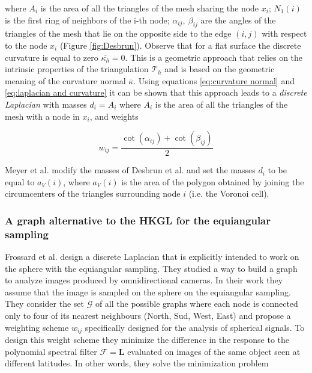 where $A_i$ is the area of all the triangles of the mesh sharing the node $x_i$; $N_1(i)$ is the first ring of neighbors of the i-th node; $\alpha_{i j},\ \beta_{i j}$ are the angles of the triangles of the mesh that lie on the opposite side to the edge $(i,j)$ with respect to the node $x_i$ (Figure \ref{fig:Desbrun}). Observe that for a flat surface the discrete curvature is equal to zero $\overline{\kappa_h}=0$. This is a geometric approach that relies on the intrinsic properties of the triangulation $\mathcal T_h$ and is based on the geometric meaning of the curvature normal $\overline{\kappa}$. Using equations \ref{eq:curvature normal} and \ref{eq:laplacian and curvature} it can be shown \cite{REUTER2009381} that this approach leads to a \textit{discrete Laplacian} with masses $d_i=A_i$ where $A_i$ is the area of all the triangles of the mesh with a node in $x_i$, and weights

$$w_{i j}=\frac{\cot \left(\alpha_{i j}\right)+\cot \left(\beta_{i j}\right)}{2}$$

Meyer et al. \cite{Meyer02discretedifferential-geometry} modify the masses of Desbrun et al. and set the masses $d_i$ to be equal to $a_{V}(i)$, where \(a_{V}(i)\) is the area of the polygon obtained by joining the circumcenters of the triangles surrounding node $i$ (i.e. the Voronoi cell).


\subsubsection{A graph alternative to the HKGL for the equiangular sampling}

Frossard et al. \cite{Frossard2017GraphBasedCO} design a discrete Laplacian that is explicitly intended to work on the sphere with the equiangular sampling. They studied a way to build a graph to analyze images produced by omnidirectional cameras. In their work they assume that the image is sampled on the sphere on the equiangular sampling. They consider the set $\mathcal G$ of all the possible graphs where each node is connected only to four of its nearest neighbours (North, Sud, West, East) and propose a weighting scheme $w_{ij}$ specifically designed for the analysis of spherical signals. To design this weight scheme they minimize the difference in the response to the polynomial spectral filter $\mathcal F = \mathbf L$ evaluated on images of the same object seen at different latitudes. In other words, they solve the minimization problem

